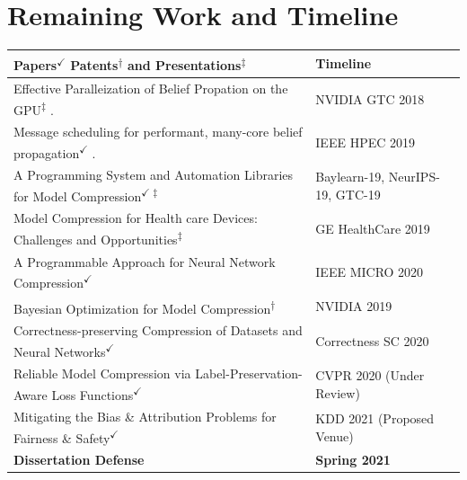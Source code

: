 \section{Remaining Work and Timeline}

 \renewcommand*{\thefootnote}{\fnsymbol{footnote}}
 \setcounter{footnote}{1}
 \renewcommand*{\thefootnote}{\arabic{footnote}}
 \setcounter{footnote}{0}

\begin{table}[h]
\centering
\begin{center}
\begin{sc}
\begin{tabular}{ll}
\toprule
\textbf{Papers\textsuperscript{$\checkmark$} Patents\textsuperscript{$\dagger$} and Presentations\textsuperscript{$\ddagger$}}                                                  & \textbf{Timeline}        \\ \midrule
Effective Paralleization of Belief Propation on the GPU\textsuperscript{$\ddagger$} .\footnotemark                  & NVIDIA GTC 2018          \\ 
Message scheduling for performant, many-core belief propagation\textsuperscript{$\checkmark$} .\footnotemark[1]         & IEEE HPEC 2019           \\ \midrule
A Programming System and Automation Libraries for Model Compression\textsuperscript{$\checkmark \ddagger$}                           & Baylearn-19, NeurIPS-19, GTC-19 \\
Model Compression for Health care Devices: Challenges and Opportunities\textsuperscript{$\ddagger$}    & GE HealthCare 2019       \\
A Programmable Approach for Neural Network  Compression\textsuperscript{$\checkmark$}                  & IEEE MICRO 2020          \\
Bayesian Optimization for Model Compression\textsuperscript{$\dagger$}                              & NVIDIA 2019              \\ \midrule
Correctness-preserving Compression of Datasets and Neural Networks\textsuperscript{$\checkmark$} & Correctness SC 2020      \\
Reliable Model Compression via Label-Preservation-Aware Loss Functions\textsuperscript{$\checkmark$}   & CVPR 2020 (Under Review) \\
Mitigating the Bias \& Attribution Problems for Fairness \& Safety\textsuperscript{$\checkmark$} & KDD 2021 (Proposed Venue)                             \\ \midrule
\textbf{Dissertation Defense}                                            & \textbf{Spring 2021} \\   
\bottomrule
\end{tabular}
\label{tab:results}
  \end{sc}
\end{center}
\end{table}

